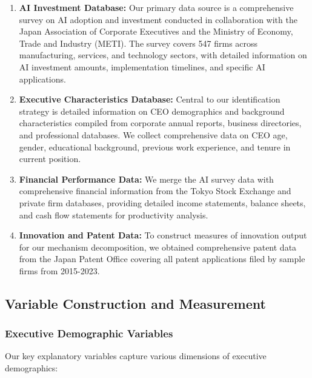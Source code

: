 \documentclass[12pt, a4paper]{article}
\begin{document}
\begin{enumerate}
\item \textbf{AI Investment Database:} Our primary data source is a comprehensive survey on AI adoption and investment conducted in collaboration with the Japan Association of Corporate Executives and the Ministry of Economy, Trade and Industry (METI). The survey covers 547 firms across manufacturing, services, and technology sectors, with detailed information on AI investment amounts, implementation timelines, and specific AI applications.

\item \textbf{Executive Characteristics Database:} Central to our identification strategy is detailed information on CEO demographics and background characteristics compiled from corporate annual reports, business directories, and professional databases. We collect comprehensive data on CEO age, gender, educational background, previous work experience, and tenure in current position.

\item \textbf{Financial Performance Data:} We merge the AI survey data with comprehensive financial information from the Tokyo Stock Exchange and private firm databases, providing detailed income statements, balance sheets, and cash flow statements for productivity analysis.

\item \textbf{Innovation and Patent Data:} To construct measures of innovation output for our mechanism decomposition, we obtained comprehensive patent data from the Japan Patent Office covering all patent applications filed by sample firms from 2015-2023.
\end{enumerate}

\subsection{Variable Construction and Measurement}

\subsubsection{Executive Demographic Variables}

Our key explanatory variables capture various dimensions of executive demographics:
\end{document}
